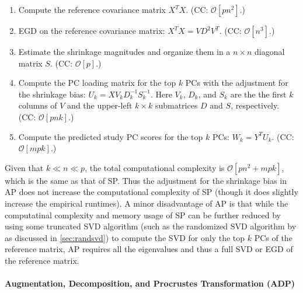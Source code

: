 \documentclass{article}
\newcommand{\bO}{\mathcal{O}}
\begin{document}
\begin{enumerate}
\item Compute the reference covariance matrix $X^T X$.
  (CC: $\bO[pn^2]$.)  
\item EGD on the reference covariance matrix: $X^T X = V D^2 V^T$.
  (CC: $\bO[n^3]$.)
\item Estimate the shrinkage magnitudes and organize them in a $n \times n$ diagonal matrix $S$.
  (CC: $\bO[p]$.)
\item Compute the PC loading matrix for the top $k$ PCs with the adjustment for the shrinkage bias: $U_k= X V_k D_k^{-1} S_k^{-1}$.
Here $V_k$, $D_k$, and $S_k$
are the the first $k$ columns of $V$
and the upper-left $k \times k$ submatrices $D$ and $S$, respectively.
(CC: $\bO[pnk]$.)
\item Compute the predicted study PC scores for the top $k$ PCs: $W_k = Y^T U_k$.
(CC: $\bO[mpk]$.)
\end{enumerate}
Given that $k \ll n \ll p$,
the total computational complexity is $\bO[pn^2 + mpk]$,
which is the same as that of SP.
Thus the adjustment for the shrinkage bias in AP
does not increase the computational complexity of SP
(though it does slightly increase the empirical runtimes).
A minor disadvantage of AP is that
while the computatinal complexity and memory usage of SP
can be further reduced
by using some truncated SVD algorithm
(such as the randomized SVD algorithm
by \citet{halko2011finding}
as discussed in \cref{sec:randsvd})
to compute the SVD for only the top $k$ PCs of the reference matrix,
AP requires all the eigenvalues
and thus a full SVD or EGD of the reference matrix.

\paragraph{Augmentation, Decomposition, and Procrustes Transformation (ADP)}
\end{document}
